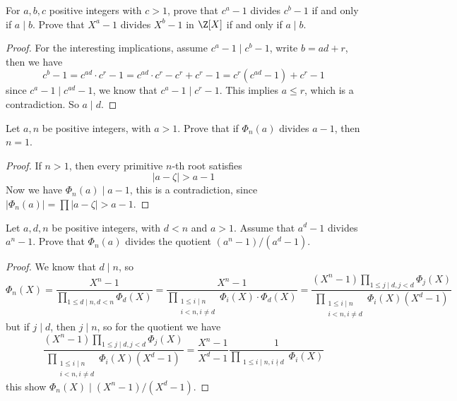 \begin{exercise}
For $a,b,c$ positive integers with $c>1$, prove that $c^a-1$ divides $c^b-1$ if and only if $a\mid b$. Prove that $X^a-1$ divides $X^b-1$ in $\Z[X]$ if and only if $a\mid b$.
\end{exercise}
\begin{proof}
For the interesting implications, assume $c^a-1\mid c^b-1$, write $b=ad+r$, then we have
\[c^b-1=c^{ad}\cdot c^r-1=c^{ad}\cdot c^r-c^r+c^r-1=c^r(c^{ad}-1)+c^r-1\]
since $c^a-1\mid c^{ad}-1$, we know that $c^a-1\mid c^r-1$. This implies $a\leq r$, which is a contradiction. So $a\mid d$.
\end{proof}
\begin{exercise}
Let $a,n$ be positive integers, with $a>1$. Prove that if $\Phi_n(a)$ divides $a-1$, then $n=1$.
\end{exercise}
\begin{proof}
If $n>1$, then every primitive $n$-th root satisfies
\[|a-\zeta|>a-1\]
Now we have $\Phi_n(a)\mid a-1$, this is a contradiction, since $|\Phi_n(a)|=\prod|a-\zeta|>a-1$.
\end{proof}
\begin{exercise}
Let $a,d,n$ be positive integers, with $d<n$ and $a>1$. Assume that $a^d-1$ divides $a^n-1$. Prove that $\Phi_n(a)$ divides the quotient $(a^n-1)/(a^d-1)$.
\end{exercise}
\begin{proof}
We know that $d\mid n$, so
\[\Phi_n(X)=\dfrac{X^n-1}{\prod_{1\leq d\mid n,d<n}\Phi_d(X)}=\dfrac{X^n-1}{\prod_{\substack{1\leq i\mid n\\i<n,i\neq d}}\Phi_i(X)\cdot\Phi_d(X)}=\dfrac{(X^n-1)\prod_{1\leq j\mid d,j<d}\Phi_j(X)}{\prod_{\substack{1\leq i\mid n\\i<n,i\neq d}}\Phi_i(X)(X^d-1)}\]
but if $j\mid d$, then $j\mid n$, so for the quotient we have
\[\dfrac{(X^n-1)\prod_{1\leq j\mid d,j<d}\Phi_j(X)}{\prod_{\substack{1\leq i\mid n\\i<n,i\neq d}}\Phi_i(X)(X^d-1)}=\dfrac{X^n-1}{X^d-1}\dfrac{1}{\prod_{\substack{1\leq i\mid n,i\nmid d}}\Phi_i(X)}\]
this show $\Phi_n(X)\mid (X^n-1)/(X^d-1)$.
\end{proof}
